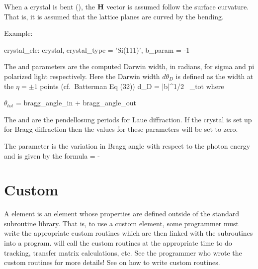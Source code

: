 When a crystal is bent (), the ${\bf H}$ vector is
assumed follow the surface curvature. That is, it is assumed that the
lattice planes are curved by the bending.

Example:
\begin{example}
  crystal_ele: crystal, crystal_type = 'Si(111)', b_param = -1
\end{example}

The  and  parameters are
the computed Darwin width, in radians, for sigma and pi polarized
light respectively. Here the Darwin width $d\theta_D$ is defined as
the width at the $\eta = \pm 1$ points
(cf.~Batterman\cite{b:batterman} Eq (32))
\Begineq
  d\theta_D = 
                 {|b|^{1/2} \, \sin\theta_{tot}}
\Endeq
where
\begin{example}
  \(\theta_{tot}\) = bragg_angle_in + bragg_angle_out 
\end{example}

The  and  are
the pendellosung periods for Laue diffraction. If the crystal is set up for
Bragg diffraction then the values for these parameters will be set to zero.

The  parameter is the variation in Bragg angle
with respect to the photon energy and is given by the formula
\Begineq
   = -
\Endeq

\section{Custom}
\label{s:custom}

A  element is an element whose properties are defined
outside of the standard \bmad subroutine library. That is, to use a
custom element, some programmer must write the appropriate custom
routines which are then linked with the \bmad subroutines into a
program. \bmad will call the custom routines at the appropriate time
to do tracking, transfer matrix calculations, etc. See the programmer
who wrote the custom routines for more details! See
 on how to write custom routines.


